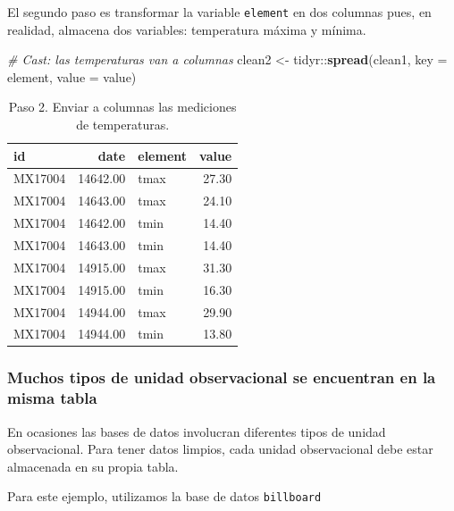 \documentclass[]{article}
\newenvironment{Shaded}{\begin{snugshade}}{\end{snugshade}}
\newcommand{\KeywordTok}[1]{\textcolor[rgb]{0.13,0.29,0.53}{\textbf{{#1}}}}
\newcommand{\DataTypeTok}[1]{\textcolor[rgb]{0.13,0.29,0.53}{{#1}}}
\newcommand{\StringTok}[1]{\textcolor[rgb]{0.31,0.60,0.02}{{#1}}}
\newcommand{\CommentTok}[1]{\textcolor[rgb]{0.56,0.35,0.01}{\textit{{#1}}}}
\newcommand{\NormalTok}[1]{{#1}}
\begin{document}
El segundo paso es transformar la variable \texttt{element} en dos
columnas pues, en realidad, almacena dos variables: temperatura máxima y
mínima.

\begin{Shaded}
\begin{Highlighting}[]
\CommentTok{# Cast: las temperaturas van a columnas}
\NormalTok{clean2 <-}\StringTok{ }\NormalTok{tidyr::}\KeywordTok{spread}\NormalTok{(clean1, }\DataTypeTok{key =} \NormalTok{element, }\DataTypeTok{value =} \NormalTok{value)}
\end{Highlighting}
\end{Shaded}

\begin{table}[ht]
\centering
\begin{tabular}{lrlr}
  \hline
id & date & element & value \\ 
  \hline
MX17004 & 14642.00 & tmax & 27.30 \\ 
  MX17004 & 14643.00 & tmax & 24.10 \\ 
  MX17004 & 14642.00 & tmin & 14.40 \\ 
  MX17004 & 14643.00 & tmin & 14.40 \\ 
  MX17004 & 14915.00 & tmax & 31.30 \\ 
  MX17004 & 14915.00 & tmin & 16.30 \\ 
  MX17004 & 14944.00 & tmax & 29.90 \\ 
  MX17004 & 14944.00 & tmin & 13.80 \\ 
   \hline
\end{tabular}
\caption{Paso 2. Enviar a columnas las mediciones de temperaturas.} 
\label{tab:clima1}
\end{table}

\subsubsection{Muchos tipos de unidad observacional se encuentran en la
misma
tabla}\label{muchos-tipos-de-unidad-observacional-se-encuentran-en-la-misma-tabla}

En ocasiones las bases de datos involucran diferentes tipos de unidad
observacional. Para tener datos limpios, cada unidad observacional debe
estar almacenada en su propia tabla.

Para este ejemplo, utilizamos la base de datos \texttt{billboard}
\parencite[][archivo: data/billboard.csv]{tidydata}
\end{document}
